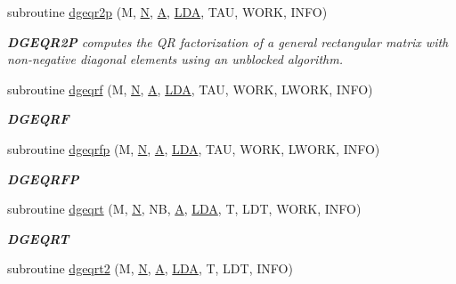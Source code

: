 \begin{DoxyCompactItemize}
subroutine \hyperlink{group__doubleGEcomputational_gacc8649ebced520728bc7086b786c7ff1}{dgeqr2p} (M, \hyperlink{polmisc_8c_a0240ac851181b84ac374872dc5434ee4}{N}, \hyperlink{classA}{A}, \hyperlink{example__user_8c_ae946da542ce0db94dced19b2ecefd1aa}{L\+D\+A}, T\+A\+U, W\+O\+R\+K, I\+N\+F\+O)
\begin{DoxyCompactList}\small\item\em {\bfseries D\+G\+E\+Q\+R2\+P} computes the Q\+R factorization of a general rectangular matrix with non-\/negative diagonal elements using an unblocked algorithm. \end{DoxyCompactList}\item 
subroutine \hyperlink{group__doubleGEcomputational_ga3766ea903391b5cf9008132f7440ec7b}{dgeqrf} (M, \hyperlink{polmisc_8c_a0240ac851181b84ac374872dc5434ee4}{N}, \hyperlink{classA}{A}, \hyperlink{example__user_8c_ae946da542ce0db94dced19b2ecefd1aa}{L\+D\+A}, T\+A\+U, W\+O\+R\+K, L\+W\+O\+R\+K, I\+N\+F\+O)
\begin{DoxyCompactList}\small\item\em {\bfseries D\+G\+E\+Q\+R\+F} \end{DoxyCompactList}\item 
subroutine \hyperlink{group__doubleGEcomputational_ga5dc72a0f55ff4c08f1a3596f56e04aaa}{dgeqrfp} (M, \hyperlink{polmisc_8c_a0240ac851181b84ac374872dc5434ee4}{N}, \hyperlink{classA}{A}, \hyperlink{example__user_8c_ae946da542ce0db94dced19b2ecefd1aa}{L\+D\+A}, T\+A\+U, W\+O\+R\+K, L\+W\+O\+R\+K, I\+N\+F\+O)
\begin{DoxyCompactList}\small\item\em {\bfseries D\+G\+E\+Q\+R\+F\+P} \end{DoxyCompactList}\item 
subroutine \hyperlink{group__doubleGEcomputational_gaddcf152e87deec6123a1899f6f51101e}{dgeqrt} (M, \hyperlink{polmisc_8c_a0240ac851181b84ac374872dc5434ee4}{N}, N\+B, \hyperlink{classA}{A}, \hyperlink{example__user_8c_ae946da542ce0db94dced19b2ecefd1aa}{L\+D\+A}, T, L\+D\+T, W\+O\+R\+K, I\+N\+F\+O)
\begin{DoxyCompactList}\small\item\em {\bfseries D\+G\+E\+Q\+R\+T} \end{DoxyCompactList}\item 
subroutine \hyperlink{group__doubleGEcomputational_gaf52830cc84214fbf513bb7f520095aa9}{dgeqrt2} (M, \hyperlink{polmisc_8c_a0240ac851181b84ac374872dc5434ee4}{N}, \hyperlink{classA}{A}, \hyperlink{example__user_8c_ae946da542ce0db94dced19b2ecefd1aa}{L\+D\+A}, T, L\+D\+T, I\+N\+F\+O)

\end{DoxyCompactItemize}
